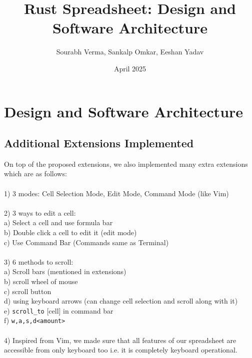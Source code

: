 \documentclass{article}
\title{Rust Spreadsheet: Design and Software Architecture}
\author{Sourabh Verma, Sankalp Omkar, Eeshan Yadav}
\date{April 2025}
\begin{document}
\maketitle

\section{Design and Software Architecture}

\subsection{Additional Extensions Implemented}
\label{sec:additional_extensions}
On top of the proposed extensions, we also implemented many extra extensions which are as follows:
\\ \\
1) 3 modes: Cell Selection Mode, Edit Mode, Command Mode (like Vim)
\\ \\
2) 3 ways to edit a cell:\\
\hspace*{5mm}a) Select a cell and use formula bar\\
\hspace*{5mm}b) Double click a cell to edit it (edit mode)\\
\hspace*{5mm}c) Use Command Bar (Commands same as Terminal)
\\ \\
3) 6 methods to scroll:\\ 
\hspace*{5mm}a) Scroll bars (mentioned in extensions)\\
\hspace*{5mm}b) scroll wheel of mouse\\
\hspace*{5mm}c) scroll button\\
\hspace*{5mm}d) using keyboard arrows (can change cell selection and scroll along with it)\\
\hspace*{5mm}e) \texttt{scroll\_to} [cell] in command bar\\
\hspace*{5mm}f) \texttt{w,a,s,d<amount>}
\\ \\
4) Inspired from Vim, we made sure that all features of our spreadsheet are accessible from only keyboard too i.e. it is completely keyboard operational.
\end{document}
